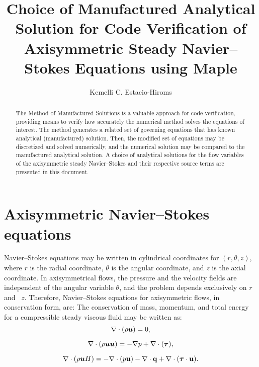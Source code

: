 \documentclass[10pt]{article}
\title{Choice of Manufactured Analytical Solution for Code Verification of Axisymmetric Steady Navier--Stokes Equations using Maple}
\author{Kemelli C. Estacio-Hiroms}
\newcommand{\bv}[1]{\ensuremath{\mbox{\boldmath$ #1 $}}}
\begin{document}
 
\maketitle

\begin{abstract}
The Method of Manufactured Solutions is a valuable approach for code verification, providing means to verify how accurately the numerical method solves the equations of interest. The method generates a related set of governing equations that has known analytical (manufactured) solution. Then, the modified set of equations may be discretized and solved numerically, and the numerical solution may be compared to the manufactured analytical solution. A choice of analytical solutions for the flow variables of the axisymmetric steady Navier--Stokes and their respective source terms are presented in this document.
\end{abstract}

\section{Axisymmetric Navier--Stokes equations}

Navier--Stokes equations may be written in cylindrical coordinates for $(r,\theta,z)$, where $r$ is the radial coordinate, $\theta$ is the angular coordinate, and $z$ is the axial coordinate. In axisymmetrical flows, the pressure and the velocity fields are independent of the angular variable $\theta$, and the problem depends exclusively on $r$ and~ $z$. Therefore, Navier--Stokes equations for axisymmetric flows, in conservation form,  are:
The conservation of mass, momentum, and total energy for a compressible steady viscous fluid may be written as:
\begin{equation}
 \label{eq:euler_01}
\nabla \cdot \left(\rho \bv{u}\right) = 0,
\end{equation}

\begin{equation}
 \label{eq:euler_02}
\nabla\cdot\left(\rho\bv{u}\bv{u}\right) = -\nabla p+  \nabla \cdot (\bv{\tau} ),
\end{equation}

\begin{equation}
 \label{eq:euler_03}
\nabla\cdot\left(\rho \bv{u} H\right) =-   \nabla\cdot(p  \mathbf{u}) -\nabla\cdot \mathbf{q} +  \nabla \cdot (\bv{\tau} \cdot \mathbf{u}).
\end{equation}
%
\end{document}
